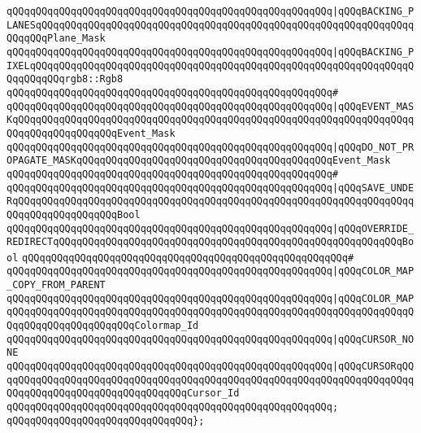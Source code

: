 \verb|qQQqqQQqqQQqqQQqqQQqqQQqqQQqqQQqqQQqqQQqqQQqqQQqqQQqqQQq|\verb#|qQQqBACKING_PLANESqQQqqQQqqQQqqQQqqQQqqQQqqQQqqQQqqQQqqQQqqQQqqQQqqQQqqQQqqQQqqQQqqQQqqQQqPlane_Mask#\newline
\verb|qQQqqQQqqQQqqQQqqQQqqQQqqQQqqQQqqQQqqQQqqQQqqQQqqQQqqQQq|\verb#|qQQqBACKING_PIXELqQQqqQQqqQQqqQQqqQQqqQQqqQQqqQQqqQQqqQQqqQQqqQQqqQQqqQQqqQQqqQQqqQQqqQQqqQQqrgb8::Rgb8#\newline
\verb|qQQqqQQqqQQqqQQqqQQqqQQqqQQqqQQqqQQqqQQqqQQqqQQqqQQqqQQq#|\newline
\verb|qQQqqQQqqQQqqQQqqQQqqQQqqQQqqQQqqQQqqQQqqQQqqQQqqQQqqQQq|\verb#|qQQqEVENT_MASKqQQqqQQqqQQqqQQqqQQqqQQqqQQqqQQqqQQqqQQqqQQqqQQqqQQqqQQqqQQqqQQqqQQqqQQqqQQqqQQqqQQqqQQqEvent_Mask#\newline
\verb|qQQqqQQqqQQqqQQqqQQqqQQqqQQqqQQqqQQqqQQqqQQqqQQqqQQqqQQq|\verb#|qQQqDO_NOT_PROPAGATE_MASKqQQqqQQqqQQqqQQqqQQqqQQqqQQqqQQqqQQqqQQqqQQqEvent_Mask#\newline
\verb|qQQqqQQqqQQqqQQqqQQqqQQqqQQqqQQqqQQqqQQqqQQqqQQqqQQqqQQq#|\newline
\verb|qQQqqQQqqQQqqQQqqQQqqQQqqQQqqQQqqQQqqQQqqQQqqQQqqQQqqQQq|\verb#|qQQqSAVE_UNDERqQQqqQQqqQQqqQQqqQQqqQQqqQQqqQQqqQQqqQQqqQQqqQQqqQQqqQQqqQQqqQQqqQQqqQQqqQQqqQQqqQQqqQQqBool#\newline
\verb|qQQqqQQqqQQqqQQqqQQqqQQqqQQqqQQqqQQqqQQqqQQqqQQqqQQqqQQq|\verb#|qQQqOVERRIDE_REDIRECTqQQqqQQqqQQqqQQqqQQqqQQqqQQqqQQqqQQqqQQqqQQqqQQqqQQqqQQqqQQqBool#\newline
\verb|qQQqqQQqqQQqqQQqqQQqqQQqqQQqqQQqqQQqqQQqqQQqqQQqqQQqqQQq#|\newline
\verb|qQQqqQQqqQQqqQQqqQQqqQQqqQQqqQQqqQQqqQQqqQQqqQQqqQQqqQQq|\verb#|qQQqCOLOR_MAP_COPY_FROM_PARENT#\newline
\verb|qQQqqQQqqQQqqQQqqQQqqQQqqQQqqQQqqQQqqQQqqQQqqQQqqQQqqQQq|\verb#|qQQqCOLOR_MAPqQQqqQQqqQQqqQQqqQQqqQQqqQQqqQQqqQQqqQQqqQQqqQQqqQQqqQQqqQQqqQQqqQQqqQQqqQQqqQQqqQQqqQQqqQQqColormap_Id#\newline
\verb|qQQqqQQqqQQqqQQqqQQqqQQqqQQqqQQqqQQqqQQqqQQqqQQqqQQqqQQq|\verb#|qQQqCURSOR_NONE#\newline
\verb|qQQqqQQqqQQqqQQqqQQqqQQqqQQqqQQqqQQqqQQqqQQqqQQqqQQqqQQq|\verb#|qQQqCURSORqQQqqQQqqQQqqQQqqQQqqQQqqQQqqQQqqQQqqQQqqQQqqQQqqQQqqQQqqQQqqQQqqQQqqQQqqQQqqQQqqQQqqQQqqQQqqQQqqQQqqQQqCursor_Id#\newline
\verb|qQQqqQQqqQQqqQQqqQQqqQQqqQQqqQQqqQQqqQQqqQQqqQQqqQQqqQQq;|\newline
\verb|qQQqqQQqqQQqqQQqqQQqqQQqqQQqqQQq};|\newline
